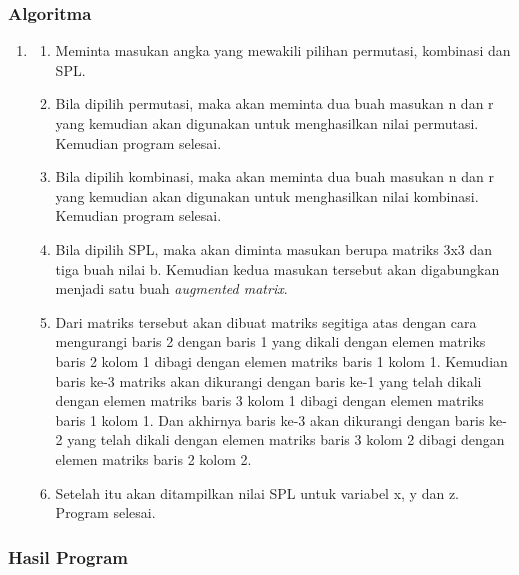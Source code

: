 \documentclass[../main.tex]{subfiles}
\begin{document}
    \subsubsection{Algoritma}
    \begin{enumerate}
        \item[]
        \begin{enumerate}
            \item{Meminta masukan angka yang mewakili pilihan permutasi, kombinasi dan SPL.}
            \item{Bila dipilih permutasi, maka akan meminta dua buah masukan n dan r yang kemudian akan digunakan untuk menghasilkan nilai permutasi. Kemudian program selesai.}
            \item{Bila dipilih kombinasi, maka akan meminta dua buah masukan n dan r yang kemudian akan digunakan untuk menghasilkan nilai kombinasi. Kemudian program selesai.}
            \item{Bila dipilih SPL, maka akan diminta masukan berupa matriks 3x3 dan tiga buah nilai b. Kemudian kedua masukan tersebut akan digabungkan menjadi satu buah \textit{augmented matrix}.}
            \item{Dari matriks tersebut akan dibuat matriks segitiga atas dengan cara mengurangi baris 2 dengan baris 1 yang dikali dengan elemen matriks baris 2 kolom 1 dibagi dengan elemen matriks baris 1 kolom 1. Kemudian baris ke-3 matriks akan dikurangi dengan baris ke-1 yang telah dikali dengan elemen matriks baris 3 kolom 1 dibagi dengan elemen matriks baris 1 kolom 1. Dan akhirnya baris ke-3 akan dikurangi dengan baris ke-2 yang telah dikali dengan elemen matriks baris 3 kolom 2 dibagi dengan elemen matriks baris 2 kolom 2.}
            \item{Setelah itu akan ditampilkan nilai SPL untuk variabel x, y dan z. Program selesai.}
        \end{enumerate}
    \end{enumerate}
    \newpage
    \subsubsectionf{\Flowchart}
    \vspace{0.5ex}

    \subsubsection{{\Source} {\sCode}}

    \subsubsection{Hasil Program}
\end{document}
